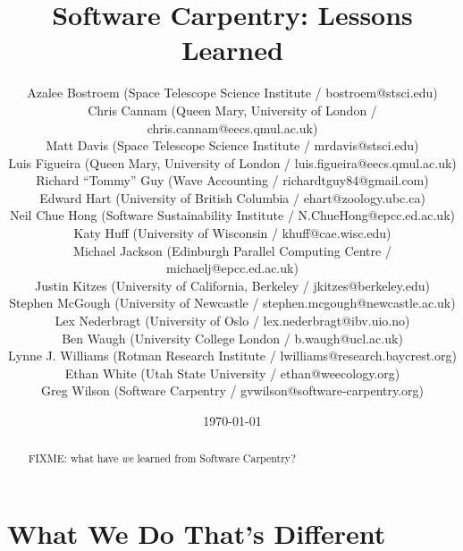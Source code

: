 \documentclass{article}
\begin{document}
\title{Software Carpentry: Lessons Learned}
\date{\today}

\author{
  Azalee Bostroem (Space Telescope Science Institute / bostroem@stsci.edu)\\
  Chris Cannam (Queen Mary, University of London / chris.cannam@eecs.qmul.ac.uk)\\
  Matt Davis (Space Telescope Science Institute / mrdavis@stsci.edu)\\
  Luis Figueira (Queen Mary, University of London / luis.figueira@eecs.qmul.ac.uk)\\
  Richard ``Tommy'' Guy (Wave Accounting / richardtguy84@gmail.com)\\
  Edward Hart (University of British Columbia / ehart@zoology.ubc.ca)\\
  Neil Chue Hong (Software Sustainability Institute / N.ChueHong@epcc.ed.ac.uk)\\
  Katy Huff (University of  Wisconsin / khuff@cae.wisc.edu)\\
  Michael Jackson (Edinburgh Parallel Computing Centre / michaelj@epcc.ed.ac.uk)\\
  Justin Kitzes (University of California, Berkeley / jkitzes@berkeley.edu)\\
  Stephen McGough (University of Newcastle / stephen.mcgough@newcastle.ac.uk) \\
  Lex Nederbragt (University of Oslo / lex.nederbragt@ibv.uio.no)\\
  Ben Waugh (University College London / b.waugh@ucl.ac.uk)\\
  Lynne J. Williams (Rotman Research Institute / lwilliams@research.baycrest.org)\\
  Ethan White (Utah State University / ethan@weecology.org)\\
  Greg Wilson (Software Carpentry / gvwilson@software-carpentry.org)
}

\maketitle

\begin{abstract}
FIXME: what have \emph{we} learned from Software Carpentry?
\end{abstract}

\section{What We Do That's Different}
\end{document}
